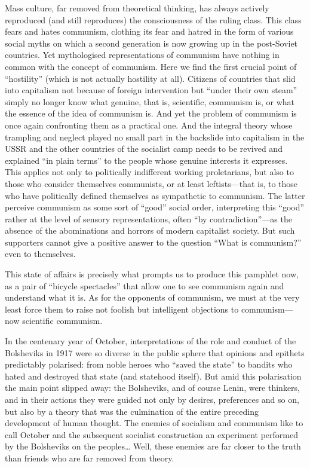 \documentclass[12pt,a4paper,openany]{book}
\begin{document}
Mass culture, far removed from theoretical thinking, has always actively reproduced (and still reproduces) the consciousness of the ruling class. This class fears and hates communism, clothing its fear and hatred in the form of various social myths on which a second generation is now growing up in the post-Soviet countries. Yet mythologised representations of communism have nothing in common with the concept of communism. Here we find the first crucial point of “hostility” (which is not actually hostility at all). Citizens of countries that slid into capitalism not because of foreign intervention but “under their own steam” simply no longer know what genuine, that is, scientific, communism is, or what the essence of the idea of communism is. And yet the problem of communism is once again confronting them as a practical one. And the integral theory whose trampling and neglect played no small part in the backslide into capitalism in the USSR and the other countries of the socialist camp needs to be revived and explained “in plain terms” to the people whose genuine interests it expresses. This applies not only to politically indifferent working proletarians, but also to those who consider themselves communists, or at least leftists—that is, to those who have politically defined themselves as sympathetic to communism. The latter perceive communism as some sort of “good” social order, interpreting this “good” rather at the level of sensory representations, often “by contradiction”—as the absence of the abominations and horrors of modern capitalist society. But such supporters cannot give a positive answer to the question “What is communism?” even to themselves.

This state of affairs is precisely what prompts us to produce this pamphlet now, as a pair of “bicycle spectacles” that allow one to see communism again and understand what it is. As for the opponents of communism, we must at the very least force them to raise not foolish but intelligent objections to communism—now scientific communism.

In the centenary year of October, interpretations of the role and conduct of the Bolsheviks in 1917 were so diverse in the public sphere that opinions and epithets predictably polarised: from noble heroes who “saved the state” to bandits who hated and destroyed that state (and statehood itself). But amid this polarisation the main point slipped away: the Bolsheviks, and of course Lenin, were thinkers, and in their actions they were guided not only by desires, preferences and so on, but also by a theory that was the culmination of the entire preceding development of human thought. The enemies of socialism and communism like to call October and the subsequent socialist construction an experiment performed by the Bolsheviks on the peoples… Well, these enemies are far closer to the truth than friends who are far removed from theory.
\end{document}
